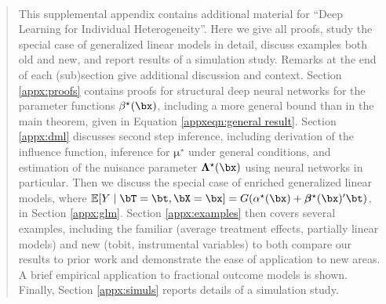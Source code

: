 \documentclass[12pt]{article}
\numberwithin{equation}{section}
\theoremstyle{definition}
\newcommand{\E}{\mathbb{E}}
\newcommand{\bmu}{\boldsymbol{\mu}}
\newcommand{\bbeta}{\boldsymbol{\beta}}
\newcommand{\bL}{\boldsymbol{\Lambda}}
\newcommand{\bmtrue}{\bmu^\star}
\newcommand{\atrue}{\alpha^\star}
\newcommand{\btrue}{\beta^\star}
\newcommand{\bbtrue}{\bbeta^\star}
\newcommand{\bLtrue}{\bL^\star}
\begin{document}
\ \vspace{1in}

\begin{abstract}
This supplemental appendix contains additional material for ``Deep Learning for Individual Heterogeneity''. Here we give all proofs, study the special case of generalized linear models in detail, discuss examples both old and new, and report results of a simulation study. Remarks at the end of each (sub)section give additional discussion and context. Section \ref{appx:proofs} contains proofs for structural deep neural networks for the parameter functions $\btrue(\bx)$, including a more general bound than in the main theorem, given in Equation \eqref{appxeqn:general result}. Section \ref{appx:dml} discusses second step inference, including derivation of the influence function, inference for $\bmtrue$ under general conditions, and estimation of the nuisance parameter $\bLtrue(\bx)$ using neural networks in particular. Then we discuss the special case of enriched generalized linear models, where $\E[Y \mid \bT = \bt, \bX=\bx] = G(\atrue(\bx) + \bbtrue(\bx)'\bt )$, in Section \ref{appx:glm}. Section \ref{appx:examples} then covers several examples, including the familiar (average treatment effects, partially linear models) and new (tobit, instrumental variables) to both compare our results to prior work and demonstrate the ease of application to new areas. A brief empirical application to fractional outcome models is shown. Finally, Section \ref{appx:simuls} reports details of a simulation study. 
\end{abstract}

\newpage
\tableofcontents
\end{document}
